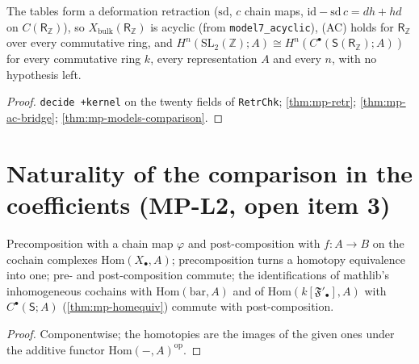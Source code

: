 \begin{theorem}\label{thm:mp-rz-ac}
  \leanok
  The tables form a deformation retraction ($\mathrm{sd}$, $c$ chain maps, $\mathrm{id}-\mathrm{sd}\,c=dh+hd$ on $C(\mathsf R_{\mathbb Z})$), so
  $X_{\mathrm{bulk}}(\mathsf R_{\mathbb Z})$ is acyclic (from \texttt{model7\_acyclic}), (AC) holds for $\mathsf R_{\mathbb Z}$ over every
  commutative ring, and $H^n(\mathrm{SL}_2(\mathbb Z);A)\cong H^n(C^\bullet(\mathsf S(\mathsf R_{\mathbb Z});A))$ for every commutative
  ring $k$, every representation $A$ and every $n$, with no hypothesis left.
\end{theorem}
\begin{proof}
  \leanok
  \texttt{decide +kernel} on the twenty fields of \texttt{RetrChk}; \ref{thm:mp-retr}; \ref{thm:mp-ac-bridge};
  \ref{thm:mp-models-comparison}.
\end{proof}

\section{Naturality of the comparison in the coefficients (MP-L2, open item 3)}

\begin{definition}\label{def:mp-prey}
  \leanok
  Precomposition with a chain map $\varphi$ and post-composition with $f\colon A\to B$ on the cochain complexes
  $\mathrm{Hom}(X_\bullet,A)$; precomposition turns a homotopy equivalence into one; pre- and post-composition commute; the
  identifications of mathlib's inhomogeneous cochains with $\mathrm{Hom}(\mathrm{bar},A)$ and of $\mathrm{Hom}(k[\mathfrak F'_\bullet],A)$ with
  $C^\bullet(\mathsf S;A)$ (\ref{thm:mp-homequiv}) commute with post-composition.
\end{definition}
\begin{proof}
  \leanok
  Componentwise; the homotopies are the images of the given ones under the additive functor $\mathrm{Hom}(-,A)^{\mathrm{op}}$.
\end{proof}

